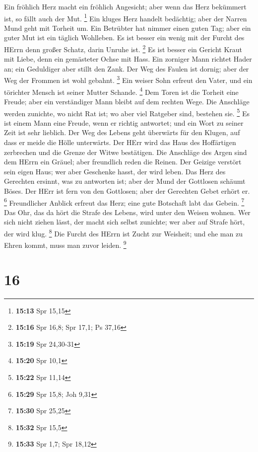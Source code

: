  Ein fröhlich Herz macht ein fröhlich Angesicht; aber wenn
das Herz bekümmert ist, so fällt auch der Mut. \footnote{\textbf{15:13}
  Spr 15,15}  Ein kluges Herz handelt bedächtig; aber der
Narren Mund geht mit Torheit um.  Ein Betrübter hat nimmer
einen guten Tag; aber ein guter Mut ist ein täglich Wohlleben.
 Es ist besser ein wenig mit der Furcht des HErrn denn
großer Schatz, darin Unruhe ist. \footnote{\textbf{15:16} Spr 16,8; Spr
  17,1; Ps 37,16}  Es ist besser ein Gericht Kraut mit
Liebe, denn ein gemästeter Ochse mit Hass.  Ein zorniger
Mann richtet Hader an; ein Geduldiger aber stillt den Zank.
 Der Weg des Faulen ist dornig; aber der Weg der Frommen
ist wohl gebahnt. \footnote{\textbf{15:19} Spr 24,30-31} 
Ein weiser Sohn erfreut den Vater, und ein törichter Mensch ist seiner
Mutter Schande. \footnote{\textbf{15:20} Spr 10,1}  Dem
Toren ist die Torheit eine Freude; aber ein verständiger Mann bleibt auf
dem rechten Wege.  Die Anschläge werden zunichte, wo nicht
Rat ist; wo aber viel Ratgeber sind, bestehen sie. \footnote{\textbf{15:22}
  Spr 11,14}  Es ist einem Mann eine Freude, wenn er
richtig antwortet; und ein Wort zu seiner Zeit ist sehr lieblich.
 Der Weg des Lebens geht überwärts für den Klugen, auf dass
er meide die Hölle unterwärts.  Der HErr wird das Haus des
Hoffärtigen zerbrechen und die Grenze der Witwe bestätigen.
 Die Anschläge des Argen sind dem HErrn ein Gräuel; aber
freundlich reden die Reinen.  Der Geizige verstört sein
eigen Haus; wer aber Geschenke hasst, der wird leben.  Das
Herz des Gerechten ersinnt, was zu antworten ist; aber der Mund der
Gottlosen schäumt Böses.  Der HErr ist fern von den
Gottlosen; aber der Gerechten Gebet erhört er. \footnote{\textbf{15:29}
  Spr 15,8; Joh 9,31}  Freundlicher Anblick erfreut das
Herz; eine gute Botschaft labt das Gebein. \footnote{\textbf{15:30} Spr
  25,25}  Das Ohr, das da hört die Strafe des Lebens, wird
unter den Weisen wohnen.  Wer sich nicht ziehen lässt, der
macht sich selbst zunichte; wer aber auf Strafe hört, der wird klug.
\footnote{\textbf{15:32} Spr 15,5}  Die Furcht des HErrn
ist Zucht zur Weisheit; und ehe man zu Ehren kommt, muss man zuvor
leiden. \footnote{\textbf{15:33} Spr 1,7; Spr 18,12}

\hypertarget{section-6}{%
\section{16}\label{section-6}}

